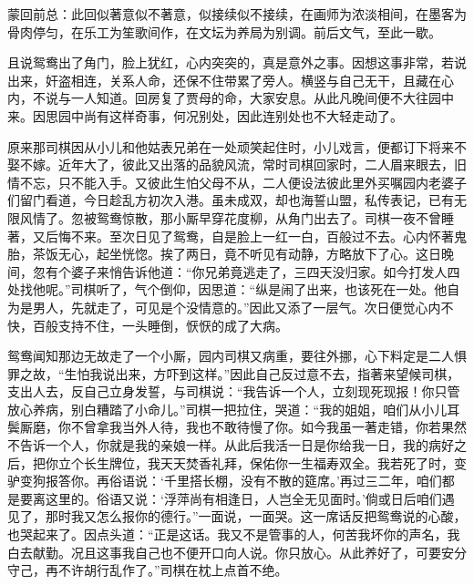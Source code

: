 

\begin{parag}
    \begin{note}蒙回前总：此回似著意似不著意，似接续似不接续，在画师为浓淡相间，在墨客为骨肉停匀，在乐工为笙歌间作，在文坛为养局为别调。前后文气，至此一歇。\end{note}
\end{parag}


\begin{parag}
    且说鸳鸯出了角门，脸上犹红，心内突突的，真是意外之事。因想这事非常，若说出来，奸盗相连，关系人命，还保不住带累了旁人。横竖与自己无干，且藏在心内，不说与一人知道。回房复了贾母的命，大家安息。从此凡晚间便不大往园中来。因思园中尚有这样奇事，何况别处，因此连别处也不大轻走动了。
\end{parag}


\begin{parag}
    原来那司棋因从小儿和他姑表兄弟在一处顽笑起住时，小儿戏言，便都订下将来不娶不嫁。近年大了，彼此又出落的品貌风流，常时司棋回家时，二人眉来眼去，旧情不忘，只不能入手。又彼此生怕父母不从，二人便设法彼此里外买嘱园内老婆子们留门看道，今日趁乱方初次入港。虽未成双，却也海誓山盟，私传表记，已有无限风情了。忽被鸳鸯惊散，那小厮早穿花度柳，从角门出去了。司棋一夜不曾睡著，又后悔不来。至次日见了鸳鸯，自是脸上一红一白，百般过不去。心内怀著鬼胎，茶饭无心，起坐恍惚。挨了两日，竟不听见有动静，方略放下了心。这日晚间，忽有个婆子来悄告诉他道：“你兄弟竟逃走了，三四天没归家。如今打发人四处找他呢。”司棋听了，气个倒仰，因思道：“纵是闹了出来，也该死在一处。他自为是男人，先就走了，可见是个没情意的。”因此又添了一层气。次日便觉心内不快，百般支持不住，一头睡倒，恹恹的成了大病。
\end{parag}


\begin{parag}
    鸳鸯闻知那边无故走了一个小厮，园内司棋又病重，要往外挪，心下料定是二人惧罪之故，“生怕我说出来，方吓到这样。”因此自己反过意不去，指著来望候司棋，支出人去，反自己立身发誓，与司棋说：“我告诉一个人，立刻现死现报！你只管放心养病，别白糟踏了小命儿。”司棋一把拉住，哭道：“我的姐姐，咱们从小儿耳鬓厮磨，你不曾拿我当外人待，我也不敢待慢了你。如今我虽一著走错，你若果然不告诉一个人，你就是我的亲娘一样。从此后我活一日是你给我一日，我的病好之后，把你立个长生牌位，我天天焚香礼拜，保佑你一生福寿双全。我若死了时，变驴变狗报答你。再俗语说：‘千里搭长棚，没有不散的筵席。’再过三二年，咱们都是要离这里的。俗语又说：‘浮萍尚有相逢日，人岂全无见面时。’倘或日后咱们遇见了，那时我又怎么报你的德行。”一面说，一面哭。这一席话反把鸳鸯说的心酸，也哭起来了。因点头道：“正是这话。我又不是管事的人，何苦我坏你的声名，我白去献勤。况且这事我自己也不便开口向人说。你只放心。从此养好了，可要安分守己，再不许胡行乱作了。”司棋在枕上点首不绝。
\end{parag}


